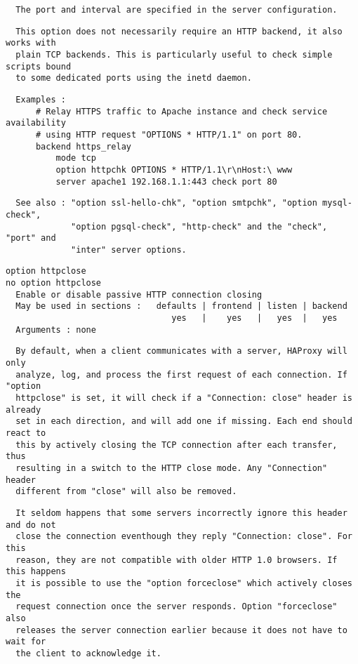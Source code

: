 \begin{verbatim}
  The port and interval are specified in the server configuration.
\end{verbatim}

\begin{verbatim}
  This option does not necessarily require an HTTP backend, it also works with
  plain TCP backends. This is particularly useful to check simple scripts bound
  to some dedicated ports using the inetd daemon.
\end{verbatim}

\begin{verbatim}
  Examples :
      # Relay HTTPS traffic to Apache instance and check service availability
      # using HTTP request "OPTIONS * HTTP/1.1" on port 80.
      backend https_relay
          mode tcp
          option httpchk OPTIONS * HTTP/1.1\r\nHost:\ www
          server apache1 192.168.1.1:443 check port 80
\end{verbatim}

\begin{verbatim}
  See also : "option ssl-hello-chk", "option smtpchk", "option mysql-check",
             "option pgsql-check", "http-check" and the "check", "port" and
             "inter" server options.
\end{verbatim}

\begin{verbatim}
option httpclose
no option httpclose
  Enable or disable passive HTTP connection closing
  May be used in sections :   defaults | frontend | listen | backend
                                 yes   |    yes   |   yes  |   yes
  Arguments : none
\end{verbatim}

\begin{verbatim}
  By default, when a client communicates with a server, HAProxy will only
  analyze, log, and process the first request of each connection. If "option
  httpclose" is set, it will check if a "Connection: close" header is already
  set in each direction, and will add one if missing. Each end should react to
  this by actively closing the TCP connection after each transfer, thus
  resulting in a switch to the HTTP close mode. Any "Connection" header
  different from "close" will also be removed.
\end{verbatim}

\begin{verbatim}
  It seldom happens that some servers incorrectly ignore this header and do not
  close the connection eventhough they reply "Connection: close". For this
  reason, they are not compatible with older HTTP 1.0 browsers. If this happens
  it is possible to use the "option forceclose" which actively closes the
  request connection once the server responds. Option "forceclose" also
  releases the server connection earlier because it does not have to wait for
  the client to acknowledge it.
\end{verbatim}

